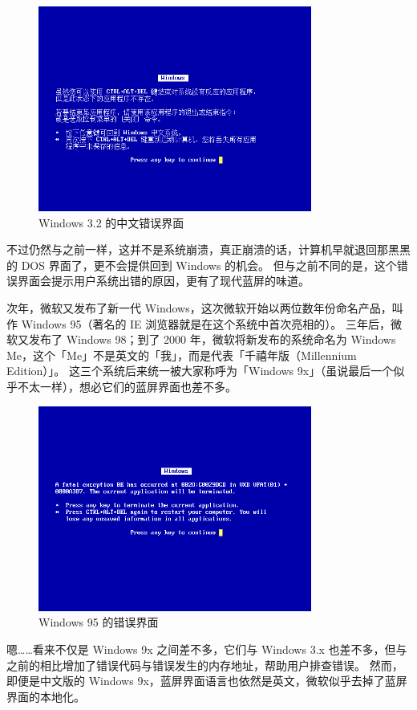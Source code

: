 \begin{figure}[htb!]
  \centering
  \includegraphics[width=9cm]{assets/Win-3.2-Error.png}
  \caption{Windows 3.2 的中文错误界面}
  \label{Win-3.2-Error}
\end{figure}

不过仍然与之前一样，这并不是系统崩溃，真正崩溃的话，计算机早就退回那黑黑的 DOS 界面了，更不会提供回到 Windows 的机会。
但与之前不同的是，这个错误界面会提示用户系统出错的原因，更有了现代蓝屏的味道。

次年，微软又发布了新一代 Windows，这次微软开始以两位数年份命名产品，叫作 Windows 95（著名的 IE 浏览器就是在这个系统中首次亮相的）。
三年后，微软又发布了 Windows 98；到了 2000 年，微软将新发布的系统命名为 Windows Me，这个「Me」不是英文的「我」，而是代表「千禧年版（Millennium Edition）」。
这三个系统后来统一被大家称呼为「Windows 9x」（虽说最后一个似乎不太一样），想必它们的蓝屏界面也差不多。

\begin{figure}[htb!]
  \centering
  \includegraphics[width=9cm]{assets/Win-95-Error.png}
  \caption{Windows 95 的错误界面}
  \label{Win-95-Error}
\end{figure}

嗯……看来不仅是 Windows 9x 之间差不多，它们与 Windows 3.x 也差不多，但与之前的相比增加了错误代码与错误发生的内存地址，帮助用户排查错误。
然而，即便是中文版的 Windows 9x，蓝屏界面语言也依然是英文，微软似乎去掉了蓝屏界面的本地化。


